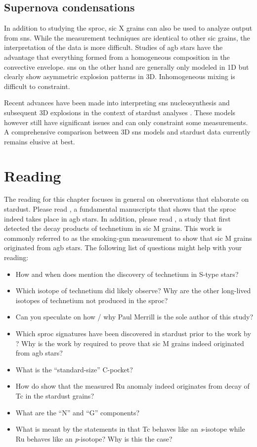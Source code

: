 \subsection{Supernova condensations}

In addition to studying the \ac{sproc}, \ac{sic} X grains can also be used to analyze output from \acp{sn}. While the measurement techniques are identical to other \ac{sic} grains, the interpretation of the data is more difficult. Studies of \ac{agb} stars have the advantage that everything formed from a homogeneous composition in the convective envelope. \acp{sn} on the other hand are generally only modeled in 1D but clearly show asymmetric explosion patterns in 3D. Inhomogeneous mixing is difficult to constraint.

Recent advances have been made into interpreting \acp{sn} nucleosynthesis and subsequent 3D explosions in the context of stardust analyses \citep{bose21}. These models however still have significant issues and can only constraint some measurements. A comprehensive comparison between 3D \acp{sn} models and stardust data currently remains elusive at best.


\section{Reading}

The reading for this chapter focuses in general on observations that elaborate on stardust. Please read \citet{merrill52}, a fundamental manuscripts that shows that the \ac{sproc} indeed takes place in \ac{agb} stars. In addition, please read \citet{savina04}, a study that first detected the decay products of technetium in \ac{sic} M grains. This work is commonly referred to as the smoking-gun measurement to show that \ac{sic} M grains originated from \ac{agb} stars. The following list of questions might help with your reading:
\begin{itemize}
    \item How and when does \citet{merrill52} mention the discovery of technetium in S-type stars?
    \item Which isotope of technetium did \citet{merrill52} likely observe? Why are the other long-lived isotopes of technetium not produced in the \ac{sproc}?
    \item Can you speculate on how / why Paul Merrill is the sole author of this study?
    \item Which \ac{sproc} signatures have been discovered in stardust prior to the work by \citet{savina04}? Why is the work by \citet{savina04} required to prove that \ac{sic} M grains indeed originated from \ac{agb} stars?
    \item What is the ``standard-size'' C-pocket?
    \item How do \citet{savina04} show that the measured Ru anomaly indeed originates from decay of Tc in the stardust grains?
    \item What are the ``N'' and ``G'' components?
    \item What is meant by the statements in \citet{savina04} that Tc behaves like an \textit{s}-isotope while Ru behaves like an \textit{p}-isotope? Why is this the case?
\end{itemize}
